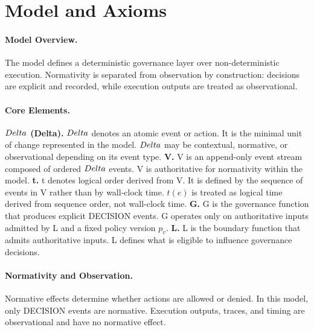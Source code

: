 \section{Model and Axioms}

\paragraph{Model Overview.}
The model defines a deterministic governance layer over non-deterministic execution. Normativity is separated from observation by construction: decisions are explicit and recorded, while execution outputs are treated as observational.

\paragraph{Core Elements.}
\textbf{$\\Delta$ (Delta).} $\\Delta$ denotes an atomic event or action. It is the minimal unit of change represented in the model. $\\Delta$ may be contextual, normative, or observational depending on its event type.  
\textbf{V.} V is an append-only event stream composed of ordered $\\Delta$ events. V is authoritative for normativity within the model.  
\textbf{t.} t denotes logical order derived from V. It is defined by the sequence of events in V rather than by wall-clock time. $t(e)$ is treated as logical time derived from sequence order, not wall-clock time.  
\textbf{G.} G is the governance function that produces explicit DECISION events. G operates only on authoritative inputs admitted by L and a fixed policy version $p_v$.  
\textbf{L.} L is the boundary function that admits authoritative inputs. L defines what is eligible to influence governance decisions.

\paragraph{Normativity and Observation.}
Normative effects determine whether actions are allowed or denied. In this model, only DECISION events are normative. Execution outputs, traces, and timing are observational and have no normative effect.

